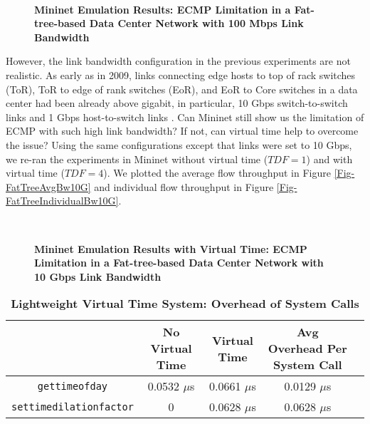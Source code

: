 \begin{figure*}[htbp]
\centering
	~
\caption{\textbf{Mininet Emulation Results: ECMP Limitation in a Fat-tree-based Data Center Network with 100 Mbps Link Bandwidth}}
\end{figure*}

However, the link bandwidth configuration in the previous experiments are not realistic. As early as in 2009, links connecting edge hosts to top of rack switches (ToR), ToR to edge of rank switches (EoR), and EoR to Core switches in a data center had been already above gigabit, in particular, 10 Gbps switch-to-switch links and 1 Gbps host-to-switch links \cite{ScaleEffDCN}. Can Mininet still show us the limitation of ECMP with such high link bandwidth? If not, can virtual time help to overcome the issue? Using the same configurations except that links were set to 10 Gbps, we re-ran the experiments in Mininet without virtual time ($TDF=1$) and with virtual time ($TDF = 4$). We plotted the average flow throughput in Figure \ref{Fig-FatTreeAvgBw10G} and individual flow throughput in Figure \ref{Fig-FatTreeIndividualBw10G}.

\begin{figure*}[htbp]
\centering

	~

\caption{\textbf{Mininet Emulation Results with Virtual Time: ECMP Limitation in a Fat-tree-based Data Center Network with 10 Gbps Link Bandwidth}}
\end{figure*}

\begin{table*}
\centering
\caption{\textbf{Lightweight Virtual Time System: Overhead of System Calls}}
\begin{tabular}{|c|c|c|c|c|} 
\hline
 & No Virtual Time & Virtual Time & Avg Overhead Per System Call \\%
\hline
\texttt{gettimeofday}  & 0.0532 $\mu$s & 0.0661 $\mu$s & 0.0129 $\mu$s\\%
\hline
\texttt{settimedilationfactor} & 0  & 0.0628 $\mu$s & 0.0628 $\mu$s\\%
\hline
\end{tabular}
\label{Tab-Overhead}
\end{table*}



